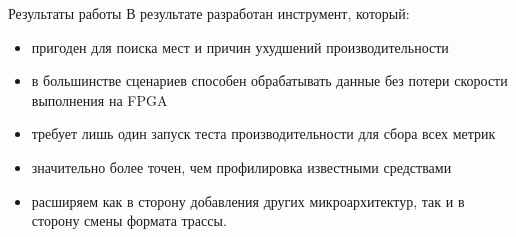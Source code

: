 \documentclass[10pt,aspectratio=169,hyperref={pdftex,unicode},xcolor=dvipsnames]{beamer}
\begin{document}
\begin{frame}{ Результаты работы }
    В результате разработан инструмент, который:
    \begin{itemize}
        \item
        пригоден для поиска мест и причин ухудшений производительности
        \pause \item
        в большинстве сценариев способен обрабатывать данные
        без потери скорости выполнения на FPGA
        \pause \item
        требует лишь один запуск теста производительности для
        сбора всех метрик
        \pause \item
        значительно более точен, чем профилировка известными
        средствами
        \pause \item
        расширяем как в сторону добавления других микроархитектур,
        так и в сторону смены формата трассы.
    \end{itemize}
\end{frame}

\end{document}
